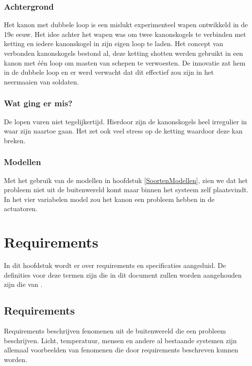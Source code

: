 \documentclass{article}
\begin{document}
\subsubsection{Achtergrond}
Het kanon met dubbele loop is een mislukt experimenteel wapen ontwikkeld in de 19e eeuw. Het idee achter het wapen was om twee kanonskogels te verbinden met ketting en iedere kanonskogel in zijn eigen loop te laden. Het concept van verbonden kanonskogels bestond al, deze ketting shotten werden gebruikt in een kanon met één loop om masten van schepen te verwoesten. De innovatie zat hem in de dubbele loop en er werd verwacht dat dit effectief zou zijn in het neermaaien van soldaten.
\subsubsection{Wat ging er mis?}
De lopen vuren niet tegelijkertijd. Hierdoor zijn de kanonskogels heel irregulier in waar zijn naartoe gaan. Het zet ook veel stress op de ketting waardoor deze kan breken.
\subsubsection{Modellen}
Met het gebruik van de modellen in hoofdstuk \ref{SoortenModellen}, zien we dat het probleem niet uit de buitenwereld komt maar binnen het systeem zelf plaatsvindt. In het vier variabelen model zou het kanon een probleem hebben in de actuatoren.
\section{Requirements}

In dit hoofdstuk wordt er over requirements en specificaties aangeduid. De definities voor deze termen zijn die in dit document zullen worden aangehouden zijn die van \cite{thompson2000requirements}. \newline

\subsection{Requirements}

Requirements beschrijven fenomenen uit de buitenwereld die een probleem beschrijven. \newline \newline
Licht, temperatuur, mensen en andere al bestaande systemen zijn allemaal voorbeelden van fenomenen die door requirements beschreven kunnen worden. \newline
\end{document}
